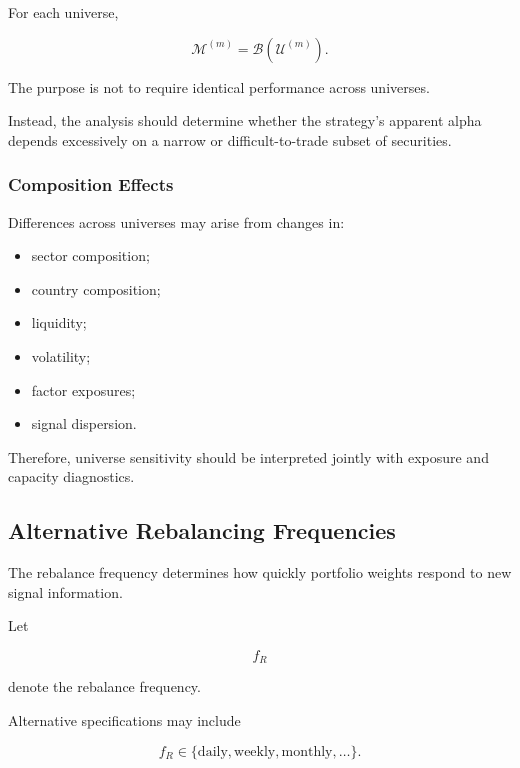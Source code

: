 \documentclass[11pt,a4paper]{article}
\begin{document}
For each universe,

\begin{equation}
\boxed{
\mathcal{M}^{(m)}
=
\mathcal{B}
\left(
\mathcal{U}^{(m)}
\right).
}
\end{equation}

The purpose is not to require identical performance across universes.

Instead, the analysis should determine whether the strategy's apparent alpha
depends excessively on a narrow or difficult-to-trade subset of securities.


\subsubsection{Composition Effects}

Differences across universes may arise from changes in:

\begin{itemize}
    \item sector composition;
    \item country composition;
    \item liquidity;
    \item volatility;
    \item factor exposures;
    \item signal dispersion.
\end{itemize}

Therefore, universe sensitivity should be interpreted jointly with exposure and
capacity diagnostics.


\subsection{Alternative Rebalancing Frequencies}
\label{subsec:alternative_rebalancing_frequencies}

The rebalance frequency determines how quickly portfolio weights respond to new
signal information.

Let

\begin{equation}
f_R
\end{equation}

denote the rebalance frequency.

Alternative specifications may include

\begin{equation}
f_R
\in
\{
\text{daily},
\text{weekly},
\text{monthly},
\ldots
\}.
\end{equation}
\end{document}
